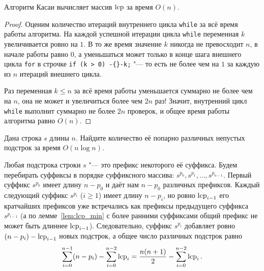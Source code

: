 \begin{theorem}
    Алгоритм Касаи вычисляет массив $\operatorname{lcp}$ за время $O(n)$.
\end{theorem}

\begin{proof}
    Оценим количество итераций внутреннего цикла \texttt{while} за всё время работы алгоритма. На каждой успешной итерации цикла \texttt{while} переменная $k$ увеличивается ровно на $1$. В то же время значение $k$ никогда не превосходит $n$, в начале работы равно $0$, а уменьшаться может только в конце шага внешнего цикла \texttt{for} в строчке \texttt{if (k > 0) -\{\}-k;} "--- то есть не более чем на $1$ за каждую из $n$ итераций внешнего цикла.

    Раз переменная $k \le n$ за всё время работы уменьшается суммарно не более чем на $n$, она не может и увеличиться более чем $2n$ раз! Значит, внутренний цикл \texttt{while} выполнит суммарно не более $2n$ проверок, и общее время работы алгоритма равно $O(n)$.
\end{proof}

\begin{problem}
    Дана строка $s$ длины $n$. Найдите количество её попарно различных непустых подстрок за время $O(n \log n)$.
\end{problem}

\begin{solution}
    Любая подстрока строки $s$ "--- это префикс некоторого её суффикса. Будем перебирать суффиксы в порядке суффиксного массива: $s^{p_0}, s^{p_1}, \dots, s^{p_{n-1}}$. Первый суффикс $s^{p_0}$ имеет длину $n - p_0$ и даёт нам $n - p_0$ различных префиксов. Каждый следующий суффикс $s^{p_i}$ ($i \ge 1$) имеет длину $n - p_i$, но ровно $\operatorname{lcp}_{i-1}$ его кратчайших префиксов уже встречались как префиксы предыдущего суффикса $s^{p_{i-1}}$ (а по лемме~\ref{lem:lcp_min} с более ранними суффиксами общий префикс не может быть длиннее $\operatorname{lcp}_{i-1}$). Следовательно, суффикс $s^{p_i}$ добавляет ровно $(n - p_i) - \operatorname{lcp}_{i-1}$ новых подстрок, а общее число различных подстрок равно
    \[
        \sum_{i=0}^{n-1} (n - p_i) - \sum_{i=0}^{n-2} \operatorname{lcp}_i = \frac{n(n+1)}{2} - \sum_{i=0}^{n-2} \operatorname{lcp}_i.
    \]
\end{solution}
